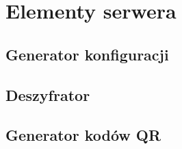 \documentclass{report}
\begin{document}
	\chapter{Elementy serwera}
		
		\section{Generator konfiguracji}
		
		\section{Deszyfrator}
		
		\section{Generator kodów QR}
			
\end{document}

